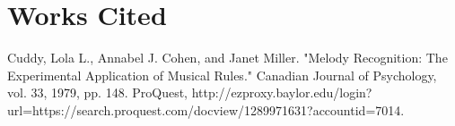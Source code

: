 \documentclass{article}
\begin{document}
	\section{Works Cited}
	Cuddy, Lola L., Annabel J. Cohen, and Janet Miller. "Melody Recognition: The Experimental Application of Musical Rules." Canadian Journal of Psychology, vol. 33, 1979, pp. 148. ProQuest, http://ezproxy.baylor.edu/login?url=https://search.proquest.com/docview/1289971631?accountid=7014.
	
\end{document}
